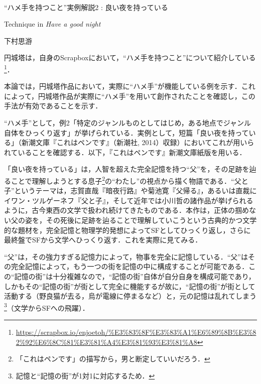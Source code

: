 \documentclass[10pt, a5paper, twoside]{jsarticle}
\theoremstyle{definition}
\begin{document}
	~ %

	\begin{center}

		\Large{“ハメ手を持つこと”実例解説2 : 良い夜を持っている}

		\vspace{3mm}

		\large{Technique in \textit{Have a good night}}

		\vspace{3mm}
		
		\large{下村思游}

	\end{center}

	\vspace{3mm}

		円城塔は，自身のScrapboxにおいて，“ハメ手を持つこと”について紹介している\footnote{\url{https://scrapbox.io/enjoetoh/%E3%83%8F%E3%83%A1%E6%89%8B%E3%82%92%E6%8C%81%E3%81%A4%E3%81%93%E3%81%A8}}．

		本論では，円城塔作品において，実際に“ハメ手”が機能している例を示す．これによって，円城塔作品が実際に“ハメ手”を用いて創作されたことを確認し，この手法が有効であることを示す．

		“ハメ手”として，例2「特定のジャンルものとしてはじめ，ある地点でジャンル自体をひっくり返す」が挙げられている．実例として，短篇「良い夜を持っている」（新潮文庫『これはペンです』（新潮社, 2014）収録）においてこれが用いられていることを確認する．以下，『これはペンです』新潮文庫紙版を用いる．

		「良い夜を持っている」は，人智を超えた完全記憶を持つ“父”を，その足跡を辿ることで理解しようとする息子\footnote{「これはペンです」の描写から，男と断定していいだろう．}の“わたし”の視点から描く物語である．“父と子”というテーマは，志賀直哉『暗夜行路』や菊池寛『父帰る』，あるいは直裁にイワン・ツルゲーネフ『父と子』，そして近年では小川哲の諸作品が挙げられるように，古今東西の文学で扱われ続けてきたものである．本作は，正体の掴めない父の姿を，その死後に足跡を辿ることで理解していこうという古典的かつ文学的な題材を，完全記憶と物理学的発想によってSFとしてひっくり返し，さらに最終盤でSFから文学へひっくり返す．これを実際に見てみる．

		“父”は，その強力すぎる記憶力によって，物事を完全に記憶している．“父”はその完全記憶によって，もう一つの街を記憶の中に構成することが可能である．この“記憶の街”は十分複雑なので，“記憶の街”自体が自分自身を構成可能であり，しかもその“記憶の街”が街として完全に機能するが故に，“記憶の街”が街として活動する（野良猫が去る，烏が電線に停まるなど）と，元の記憶は乱れてしまう\footnote{記憶と“記憶の街”が1対1に対応するため．}（文学からSFへの飛躍）．
\end{document}
